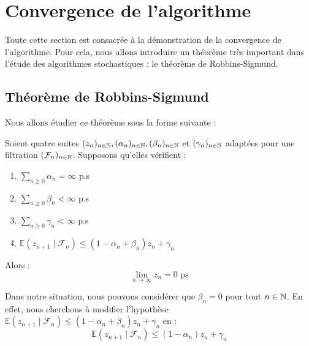 
\section{Convergence de l'algorithme}

Toute cette section est consacrée à la démonstration de la convergence de l'algorithme. Pour cela, nous allons introduire 
un théorème très important dans l'étude des algorithmes stochastiques : le théorème de Robbins-Sigmund. 

\subsection{Théorème de Robbins-Sigmund}

Nous allons étudier ce théorème sous la forme suivante : 

\begin{theorem}
    Soient quatre suites $(z_n)_{n \in \mathbb{N}}, ( \alpha_n)_{n \in \mathbb{N}}, ( \beta_n)_{n \in \mathbb{N}} $ et $ ( \gamma_n)_{n \in \mathbb{N}}$
    adaptées pour une filtration $( \mathcal{F}_n)_{n \in \mathbb{N}}$. Supposons qu'elles vérifient : 
        \begin{enumerate}[label=\roman*)]
            \item $ \displaystyle \sum_{n \geqslant 0} \alpha_n = \infty $ p.s
            \item $ \displaystyle \sum_{n \geqslant 0} \beta_n < \infty $ p.s 
            \item $ \displaystyle \sum_{n \geqslant 0} \gamma_n < \infty $ p.s
            \item $ \displaystyle \mathbb{E}(z_{n+1} \mid \mathcal{F}_n) \leqslant (1 - \alpha_n + \beta_n) z_n + \gamma_n$
        \end{enumerate}
    
    \medskip
    
    Alors : 
        \begin{equation}
            \lim_{n \to \infty} z_n = 0 \text{ ps}  
        \end{equation}
\end{theorem}

Dans notre situation, nous pouvons considérer que $ \beta_n = 0$ pour tout $n \in \mathbb{N}$. 
En effet, nous cherchons à modifier l'hypothèse $\mathbb{E}(z_{n+1} \mid \mathcal{F}_n) \leqslant (1 - \alpha_n + \beta_n) z_n + \gamma_n$ 
en : 
    $$ \mathbb{E}(z_{n+1} \mid \mathcal{F}_n) \leqslant (1 - \alpha_n) z_n + \gamma_n $$ 

